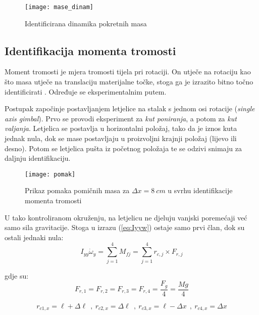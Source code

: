 \documentclass[11pt,a4paper]{article}
\begin{document}
\begin{figure}[H]
	\centering
	\texttt{[image: mase\_dinam]}
	\caption{Identificirana dinamika pokretnih masa}
	\label{fig:masa_din}
\end{figure}


\subsection{Identifikacija momenta tromosti}

Moment tromosti je mjera tromosti tijela pri rotaciji. On utječe na rotaciju kao što masa utječe na translaciju materijalne točke, stoga ga je izrazito bitno točno identificirati \cite{fiz1}. Određuje se eksperimentalnim putem. 

\medskip

Postupak započinje postavljanjem letjelice na stalak s jednom osi rotacije (\textit{single axis gimbal}). Prvo se provodi eksperiment za \textit{kut poniranja}, a potom za \textit{kut valjanja}. Letjelica se postavlja u horizontalni položaj, tako da je iznos kuta jednak nula, dok se mase postavljaju u proizvoljni krajnji položaj (lijevo ili desno). Potom se letjelica pušta iz početnog položaja te se odzivi snimaju za daljnju identifikaciju. 

\begin{figure}[H]
	\centering
	\texttt{[image: pomak]}
	\caption{Prikaz pomaka pomičnih masa za $\Delta x = 8 \ cm$ u svrhu identifikacije momenta tromosti}
	\label{fig:}
\end{figure}


\medskip

U tako kontroliranom okruženju, na letjelicu ne djeluju vanjski poremećaji već samo sila gravitacije. Stoga u izrazu (\ref{eq:Iyyw}) ostaje samo prvi član, dok su ostali jednaki nula:
\begin{equation}
I_{yy} \dot{\omega}_{y} = \sum_{j=1}^{4} M_{fj}  =  \sum_{j=1}^{4} r_{c,j} \times F_{r,j}
\label{eq:Iyyw2}
\end{equation}

gdje su:
\begin{equation}
F_{r,1} = F_{r,2} = F_{r,3} = F_{r,4} = \frac{F_{g}}{4} = \frac{Mg}{4}
\label{eq:F1234}
\end{equation}

\begin{equation}
r_{c1,x} = \ell + \Delta \ell \  \  , \ r_{c2,x} = \Delta \ell \  \ , \  r_{c3,x} = \ell - \Delta x \  \ , \  r_{c4,x} =  \Delta x
\label{eq:rcj}
\end{equation}
\end{document}
